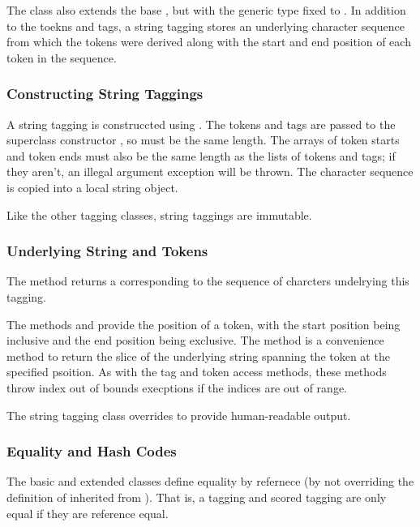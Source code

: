The class  also extends the base
, but with the generic type  fixed to
.  In addition to the toekns and tags, a string tagging
stores an underlying character sequence from which the tokens were
derived along with the start and end position of each token in the
sequence.  

\subsubsection{Constructing String Taggings}

A string tagging is construccted using
.  The tokens and tags are
passed to the superclass constructor
, so must be the same length.
The arrays of token starts and token ends must also be the same length
as the lists of tokens and tags; if they aren't, an illegal argument
exception will be thrown.  The character sequence is copied into a
local string object.

Like the other tagging classes, string taggings are immutable.

\subsubsection{Underlying String and Tokens}

The method  returns a 
corresponding to the sequence of charcters undelrying this tagging.

The methods  and  provide
the position of a token, with the start position being inclusive and
the end position being exclusive.  The method  is
a convenience method to return the slice of the underlying string
spanning the token at the specified psoition.  As with the tag and
token access methods, these methods throw index out of bounds
execptions if the indices are out of range.

The string tagging class overrides  to provide
human-readable output.


\subsubsection{Equality and Hash Codes}

The basic  and extended  classes
define equality by refernece (by not overriding the definition of
 inherited from ).  That
is, a tagging and scored tagging are only equal if they are reference
equal.  


